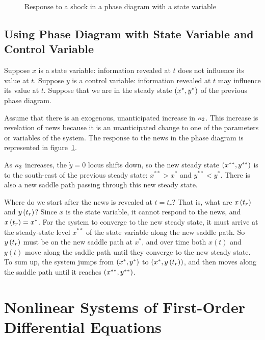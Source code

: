 \documentclass[letterpaper,12pt,leqno]{article}
\newcommand{\pdf}{phasediagrams.pdf}
\begin{document}
\begin{figure}[p]
\hfill
{}\vfig
{}\hfill
{}
\caption{Response to a shock in a phase diagram with a state variable}
\label{f:news}\end{figure}


\subsection{Using Phase Diagram with State Variable and Control Variable}

Suppose $x$ is a state variable: information revealed at $t$ does not influence its value at $t$. Suppose $y$ is a control variable: information revealed at $t$ may influence its value at $t$. Suppose that we are in the steady state $\left( x^{*},y^{*} \right)$ of the previous phase diagram. 

Assume that there is an exogenous, unanticipated increase in $\kappa_{2}$. This increase is revelation of news because it is an unanticipated change to one of the parameters or variables of the system. The response to the news in the phase diagram is represented in figure~\ref{f:news}.

As $\kappa_{2}$ increases, the $\dot{y}=0$ locus shifts down, so the new steady state $\left( x^{* *},y^{* *} \right) $ is to the south-east of the previous steady state: $x^{* *}>x^{*}$ and $y^{* *}<y^{*}.$ There is also a new saddle path passing through this new steady state.

Where do we start after the news is revealed at $t=t_{r}$? That is, what are $x\left( t_{r} \right)$ and $y\left( t_{r} \right)$? Since $x$ is the state variable, it cannot respond to the news, and $x\left( t_{r} \right) =x^{*}$. For the system to converge to the new steady state, it must arrive at the steady-state level $x^{* *}$ of the state variable along the new saddle path. So $y\left( t_{r} \right) $ must be on the new saddle path at $x^{*}$, and over time both $x(t) $ and $y(t) $ move along the saddle path until they converge to the new steady state. To sum up, the system jumps from $\left( x^{*},y^{*} \right)$ to $\left( x^{*},y\left( t_{r} \right) \right) $, and then moves along the saddle path until it reaches $\left( x^{* *},y^{* *} \right)$.


\section{Nonlinear Systems of First-Order Differential Equations}
\end{document}

